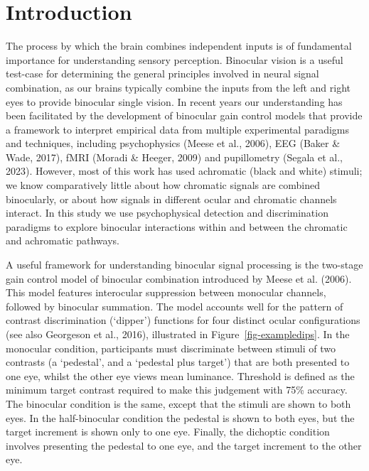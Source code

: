 \documentclass[
  letterpaper,
  DIV=11,
  numbers=noendperiod]{scrartcl}
\begin{document}
\hypertarget{introduction}{%
\section{Introduction}\label{introduction}}

The process by which the brain combines independent inputs is of
fundamental importance for understanding sensory perception. Binocular
vision is a useful test-case for determining the general principles
involved in neural signal combination, as our brains typically combine
the inputs from the left and right eyes to provide binocular single
vision. In recent years our understanding has been facilitated by the
development of binocular gain control models that provide a framework to
interpret empirical data from multiple experimental paradigms and
techniques, including psychophysics (Meese et al., 2006), EEG (Baker \&
Wade, 2017), fMRI (Moradi \& Heeger, 2009) and pupillometry (Segala et
al., 2023). However, most of this work has used achromatic (black and
white) stimuli; we know comparatively little about how chromatic signals
are combined binocularly, or about how signals in different ocular and
chromatic channels interact. In this study we use psychophysical
detection and discrimination paradigms to explore binocular interactions
within and between the chromatic and achromatic pathways.

A useful framework for understanding binocular signal processing is the
two-stage gain control model of binocular combination introduced by
Meese et al. (2006). This model features interocular suppression between
monocular channels, followed by binocular summation. The model accounts
well for the pattern of contrast discrimination (`dipper') functions for
four distinct ocular configurations (see also Georgeson et al., 2016),
illustrated in Figure~\ref{fig-exampledips}. In the monocular condition,
participants must discriminate between stimuli of two contrasts (a
`pedestal', and a `pedestal plus target') that are both presented to one
eye, whilst the other eye views mean luminance. Threshold is defined as
the minimum target contrast required to make this judgement with 75\%
accuracy. The binocular condition is the same, except that the stimuli
are shown to both eyes. In the half-binocular condition the pedestal is
shown to both eyes, but the target increment is shown only to one eye.
Finally, the dichoptic condition involves presenting the pedestal to one
eye, and the target increment to the other eye.
\end{document}
